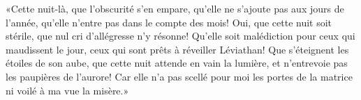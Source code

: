 «Cette nuit-là, que l’obscurité s’en empare,
	qu’elle ne s’ajoute pas aux jours de l’année,
	qu’elle n’entre pas dans le compte des mois!
Oui, que cette nuit soit stérile, que nul cri d’allégresse n’y résonne!
Qu’elle soit malédiction pour ceux qui maudissent le jour,
	ceux qui sont prêts à réveiller Léviathan!
Que s’éteignent les étoiles de son aube, que cette nuit attende en vain la lumière,
	et n’entrevoie pas les paupières de l’aurore!
Car elle n’a pas scellé pour moi les portes de la matrice ni voilé à ma vue la misère.»

